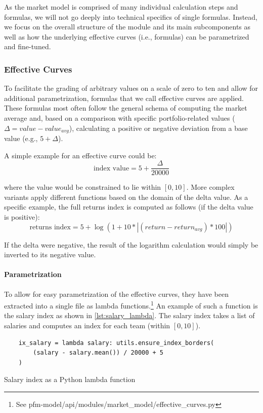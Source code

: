 As the market model is comprised of many individual calculation steps and formulas, we will not go deeply into technical specifics of single formulas. Instead, we focus on the overall structure of the module and its main subcomponents as well as how the underlying effective curves (i.e., formulas) can be parametrized and fine-tuned.

\subsubsection{Effective Curves}
To facilitate the grading of arbitrary values on a scale of zero to ten and allow for additional parametrization, formulas that we call effective curves are applied. These formulas most often follow the general schema of computing the market average and, based on a comparison with specific portfolio-related values (\(\Delta = value - value_{avg}\)), calculating a positive or negative deviation from a base value (e.g., \(5 + \Delta \)).

A simple example for an effective curve could be:
\[\text{index value} = 5 + \frac{\Delta}{20000}\]

where the value would be constrained to lie within \([0, 10]\). More complex variants apply different functions based on the domain of the delta value. As a specific example, the full returns index is computed as follows (if the delta value is positive):
\[\text{returns index} = 5 + \log(1 + 10 * |(return - return_{avg}) * 100|)\]

If the delta were negative, the result of the logarithm calculation would simply be inverted to its negative value.

\paragraph{Parametrization}
To allow for easy parametrization of the effective curves, they have been extracted into a single file as lambda functions.\footnote{See pfm-model/api/modules/market\_model/effective\_curves.py} An example of such a function is the salary index as shown in \cref{lst:salary_lambda}. The salary index takes a list of salaries and computes an index for each team (within \([0, 10]\)).

\begin{listing}[h!]
    \begin{verbatim}
    ix_salary = lambda salary: utils.ensure_index_borders(
        (salary - salary.mean()) / 20000 + 5
    )
    \end{verbatim}
    \caption{Salary index as a Python lambda function}
    \label{lst:salary_lambda}
\end{listing}

